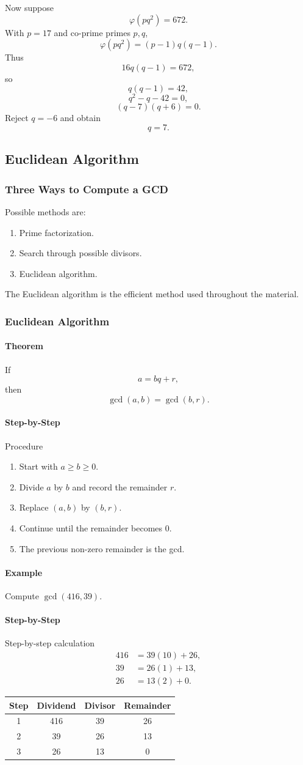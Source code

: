 \documentclass[12pt]{article}
\newcommand{\Step}{\paragraph{Step-by-Step}}
\newcommand{\Example}{\paragraph{Example}}
\newcommand{\Theorem}{\paragraph{Theorem}}
\begin{document}
Now suppose
\[
\varphi(pq^2)=672.
\]
With $p=17$ and co-prime primes $p,q$,
\[
\varphi(pq^2)=(p-1)q(q-1).
\]
Thus
\[
16q(q-1)=672,
\]
so
\[
q(q-1)=42,
\]
\[
q^2-q-42=0,
\]
\[
(q-7)(q+6)=0.
\]
Reject $q=-6$ and obtain
\[
q=7.
\]

\subsection{Euclidean Algorithm}
\subsubsection{Three Ways to Compute a GCD}
Possible methods are:
\begin{enumerate}
    \item Prime factorization.
    \item Search through possible divisors.
    \item Euclidean algorithm.
\end{enumerate}
The Euclidean algorithm is the efficient method used throughout the material.

\subsubsection{Euclidean Algorithm}
\Theorem If
\[
a=bq+r,
\]
then
\[
\gcd(a,b)=\gcd(b,r).
\]

\Step{Procedure}
\begin{enumerate}
    \item Start with $a\ge b\ge0$.
    \item Divide $a$ by $b$ and record the remainder $r$.
    \item Replace $(a,b)$ by $(b,r)$.
    \item Continue until the remainder becomes $0$.
    \item The previous non-zero remainder is the gcd.
\end{enumerate}

\Example
Compute $\gcd(416,39)$.

\Step{Step-by-step calculation}
\begin{align*}
416&=39(10)+26,\\
39&=26(1)+13,\\
26&=13(2)+0.
\end{align*}

\begin{table}[H]
\centering
\begin{tabular}{c c c c}
\toprule
Step & Dividend & Divisor & Remainder\\
\midrule
1 & 416 & 39 & 26\\
2 & 39 & 26 & 13\\
3 & 26 & 13 & 0\\
\bottomrule
\end{tabular}
\end{table}
\end{document}
